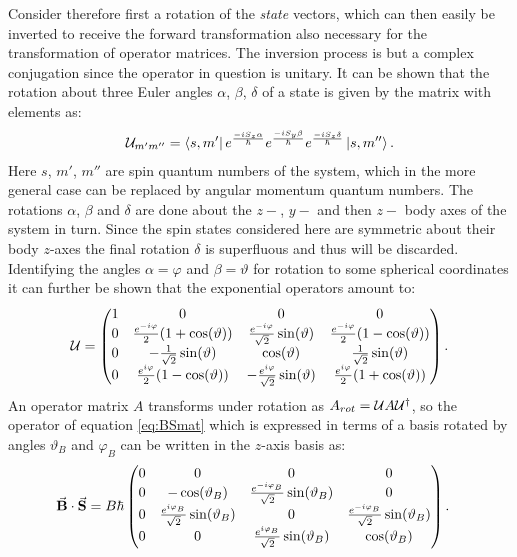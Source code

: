 \documentclass[a4paper]{article}
\begin{document}
Consider therefore first a rotation of the \textit{state} vectors, which can then easily
be inverted to receive the forward transformation also necessary for the transformation
of operator matrices. The inversion process is but a complex
conjugation since the operator in question is unitary. It can be shown 
that the rotation about three Euler angles \(\alpha\), \(\beta\), \(\delta\) of a state is
given  by the matrix with elements as\cite{sakurai}:
\begin{align*}
        \mathbb{\cal U}_{m'm''} = \bra{s,
        m'}e^{\frac{-iS_z\alpha}{\hbar}}e^{\frac{-iS_y\beta}{\hbar}}e^{\frac{-iS_z\delta}{\hbar{}}}\ket{s,
m''}
.\end{align*}
Here \(s\), \(m'\), \(m''\) are spin quantum numbers of the system, which in the more general
case can be replaced by angular momentum quantum numbers. The rotations \(\alpha\),
\(\beta\) and \(\delta\) are done about the \(z-\), \(y-\) and then \(z-\) body axes of
the system in turn. Since the spin states considered here are symmetric about their
body \(z\)-axes the final rotation \(\delta\) is superfluous and thus will be discarded.
Identifying the angles \(\alpha = \varphi\) and \(\beta = \vartheta\) for rotation to some
spherical coordinates it can further be
shown that the exponential operators amount to:
\begin{align*}
        \U = \pmqty{
        1 & 0 & 0 & 0\\
        0 & \frac{e^{-i\varphi}}{2}(1+\cos(\vartheta)) &
        \frac{e^{-i\varphi}}{\sqrt{2}}\sin(\vartheta) &
        \frac{e^{-i\varphi}}{2}(1-\cos(\vartheta))\\
        0 & -\frac{1}{\sqrt{2}}\sin(\vartheta) & \cos(\vartheta) & \frac{1}{\sqrt{2} }
        \sin(\vartheta)\\
        0 & \frac{e^{i\varphi}}{2}(1-\cos(\vartheta)) &
        -\frac{e^{i\varphi}}{\sqrt{2}}\sin(\vartheta) & \frac{e^{i\varphi}}{2}(1 +
        \cos(\vartheta))
}
.\end{align*}
An operator matrix \(A\) transforms under rotation as \(A_{rot} = \mathbb{\cal U} A\mathbb{\cal U}^{\dagger}\), so
the operator of equation \ref{eq:BSmat} which is expressed in terms of a basis rotated by
angles \(\vartheta_B\) and \(\varphi_B\) can be written in the \(z\)-axis basis as:
\begin{align}\label{eq:BSrot}
    \va{B}\cdot \va{S} &= B\hbar{}\pmqty{
            0 & 0 & 0 & 0\\
            0 & -\cos(\vartheta_B) & \frac{e^{-i\varphi_B}}{\sqrt{2} }\sin(\vartheta_B) & 0\\
                    0 & \frac{e^{i\varphi_B}}{\sqrt{2} }\sin(\vartheta_B) & 0 &
                    \frac{e^{-i\varphi_B}}{\sqrt{2} }\sin(\vartheta_B)\\
                    0 & 0 & \frac{e^{i\varphi_B}}{\sqrt{2} }\sin(\vartheta_B) & \cos(\vartheta_B)
            }
.\end{align}
\end{document}
